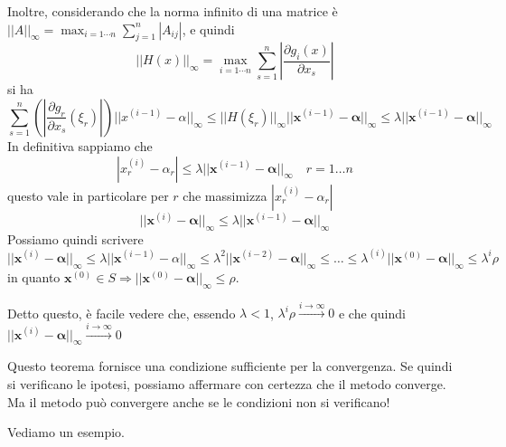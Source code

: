 \begin{thproof}
\begin{description}
Inoltre, considerando che la norma infinito di una matrice è $|| A ||_{\infty} = \displaystyle \max_{i=1 \cdots n}\sum_{j=1}^n|A_{ij}|$, e quindi $$|| H(x) ||_{\infty}  = \displaystyle \max_{i=1 \cdots n}\displaystyle \sum_{s=1}^{n}\left|\frac{\partial g_i(x)}{\partial x_s}\right|$$ si ha
\[
 \sum^{n}_{s = 1} \left(\left| \dfrac{\partial g_r}{\partial x_s}(\xi_r) \right| \right) || x^{(i-1)} - \alpha ||_{\infty} \leq || H(\xi_r) ||_{\infty}  || \mathbf{x}^{(i-1)} - \mathbf{\alpha} ||_{\infty} \leq \lambda || \mathbf{x}^{(i-1)} - \mathbf{\alpha} ||_{\infty} \]
In definitiva sappiamo che
\[ | x_r^{(i)} - \alpha_r | \leq \lambda || \mathbf{x}^{(i-1)} - 
\mathbf{\alpha} ||_{\infty} \quad r=1 \ldots n \]
questo vale in particolare per $r$ che massimizza  $| x_r^{(i)} - \alpha_r | $
\[ || \mathbf{x}^{(i)} - \mathbf{\alpha} ||_{\infty} \leq \lambda || \mathbf{x}^{(i-1)} - \mathbf{\alpha} ||_{\infty} \]
Possiamo quindi scrivere
\[ || \mathbf{x}^{(i)} - \mathbf{\alpha} ||_{\infty} \leq \lambda || \mathbf{x}^{(i-1)} - \alpha ||_{\infty} \leq \lambda^2 || \mathbf{x}^{(i-2)} - \mathbf{\alpha} ||_{\infty} \leq \ldots \leq \lambda^{(i)} || \mathbf{x}^{(0)} - \mathbf{\alpha} ||_{\infty} \leq \lambda^i \rho \]
in quanto $ \mathbf{x}^{(0)} \in S \Rightarrow ||\mathbf{x}^{(0)} - \mathbf{\alpha} ||_{\infty}
\leq \rho $.
\end{description}

Detto questo, \`e facile vedere che, essendo $ \lambda < 1 $, $
\lambda^i \rho \xrightarrow{i \rightarrow \infty} 0 $ e che quindi $
|| \mathbf{x}^{(i)} - \mathbf{\alpha} ||_{\infty} \xrightarrow{i \rightarrow \infty} 0 $
\end{thproof}

Questo teorema fornisce una condizione sufficiente per la
convergenza. Se quindi si verificano le ipotesi, possiamo affermare
con certezza che il metodo converge. Ma il metodo pu\`o convergere
anche se le condizioni non si verificano!

Vediamo un esempio.

